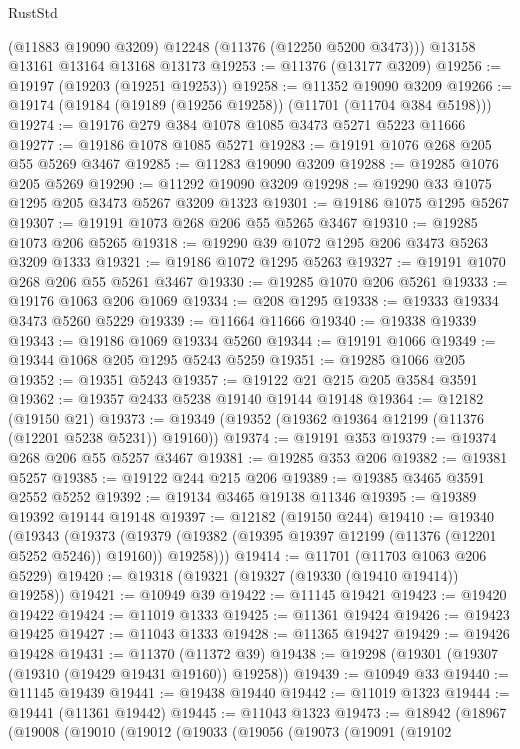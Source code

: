 \begin{lexlean}{RustStd}
\begin{coremodule}
{{{{{{{{{{{{{{{{{{{      (@11883 @19090 @3209)
      @12248
      (@11376 (@12250 @5200 @3473)))
    @13158
    @13161
    @13164
    @13168
    @13173
@19253 := @11376 (@13177 @3209)
@19256 := @19197 (@19203 (@19251 @19253))
@19258 := @11352 @19090 @3209
@19266 := @19174 (@19184 (@19189 (@19256 @19258)) (@11701 (@11704 @384 @5198)))
@19274 := @19176 @279 @384 @1078 @1085 @3473 @5271 @5223 @11666
@19277 := @19186 @1078 @1085 @5271
@19283 := @19191 @1076 @268 @205 @55 @5269 @3467
@19285 := @11283 @19090 @3209
@19288 := @19285 @1076 @205 @5269
@19290 := @11292 @19090 @3209
@19298 := @19290 @33 @1075 @1295 @205 @3473 @5267 @3209 @1323
@19301 := @19186 @1075 @1295 @5267
@19307 := @19191 @1073 @268 @206 @55 @5265 @3467
@19310 := @19285 @1073 @206 @5265
@19318 := @19290 @39 @1072 @1295 @206 @3473 @5263 @3209 @1333
@19321 := @19186 @1072 @1295 @5263
@19327 := @19191 @1070 @268 @206 @55 @5261 @3467
@19330 := @19285 @1070 @206 @5261
@19333 := @19176 @1063 @206 @1069
@19334 := @208 @1295
@19338 := @19333 @19334 @3473 @5260 @5229
@19339 := @11664 @11666
@19340 := @19338 @19339
@19343 := @19186 @1069 @19334 @5260
@19344 := @19191 @1066
@19349 := @19344 @1068 @205 @1295 @5243 @5259
@19351 := @19285 @1066 @205
@19352 := @19351 @5243
@19357 := @19122 @21 @215 @205 @3584 @3591
@19362 := @19357 @2433 @5238 @19140 @19144 @19148
@19364 := @12182 (@19150 @21)
@19373 := @19349 (@19352 (@19362 @19364 @12199 (@11376 (@12201 @5238 @5231)) @19160))
@19374 := @19191 @353
@19379 := @19374 @268 @206 @55 @5257 @3467
@19381 := @19285 @353 @206
@19382 := @19381 @5257
@19385 := @19122 @244 @215 @206
@19389 := @19385 @3465 @3591 @2552 @5252
@19392 := @19134 @3465 @19138 @11346
@19395 := @19389 @19392 @19144 @19148
@19397 := @12182 (@19150 @244)
@19410 := @19340
    (@19343
      (@19373 (@19379 (@19382 (@19395 @19397 @12199 (@11376 (@12201 @5252 @5246)) @19160)) @19258)))
@19414 := @11701 (@11703 @1063 @206 @5229)
@19420 := @19318 (@19321 (@19327 (@19330 (@19410 @19414)) @19258))
@19421 := @10949 @39
@19422 := @11145 @19421
@19423 := @19420 @19422
@19424 := @11019 @1333
@19425 := @11361 @19424
@19426 := @19423 @19425
@19427 := @11043 @1333
@19428 := @11365 @19427
@19429 := @19426 @19428
@19431 := @11370 (@11372 @39)
@19438 := @19298 (@19301 (@19307 (@19310 (@19429 @19431 @19160)) @19258))
@19439 := @10949 @33
@19440 := @11145 @19439
@19441 := @19438 @19440
@19442 := @11019 @1323
@19444 := @19441 (@11361 @19442)
@19445 := @11043 @1323
@19473 := @18942
    (@18967
      (@19008
        (@19010
          (@19012
            (@19033
              (@19056
                (@19073
                  (@19091
                    (@19102
}}}}}}}}}}}}}}}}}}}
\end{coremodule}
\end{lexlean}

